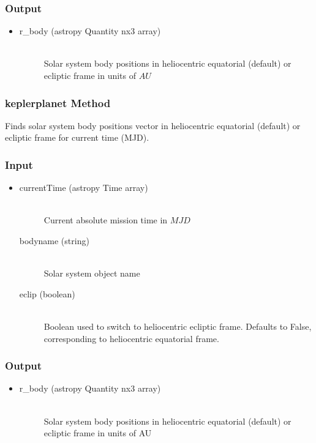 \documentclass[cleanfoot]{asme2ej}
\begin{document}
\subsubsection*{Output}
\begin{itemize}
\item
\begin{description}
    \item[r\_body (astropy Quantity nx3 array)] \hfill \\ Solar system body positions in heliocentric equatorial (default) or ecliptic frame in units of $AU$
\end{description}
\end{itemize}

\subsubsection{keplerplanet Method} \label{sec:keplerplanet}
Finds solar system body positions vector in heliocentric equatorial (default) or ecliptic frame for current time (MJD).
\subsubsection*{Input}
\begin{itemize}
\item
\begin{description}
    \item[currentTime (astropy Time array)] \hfill \\ Current absolute mission time in $MJD$
    \item[bodyname (string)] \hfill \\ Solar system object name
    \item[eclip (boolean)] \hfill \\ Boolean used to switch to heliocentric ecliptic frame. Defaults to False, corresponding to heliocentric equatorial frame.
\end{description}
\end{itemize}
\subsubsection*{Output}
\begin{itemize}
\item
\begin{description}
    \item[r\_body (astropy Quantity nx3 array)] \hfill \\ Solar system body positions in heliocentric equatorial (default) or ecliptic frame in units of AU
\end{description}
\end{itemize}
\end{document}
